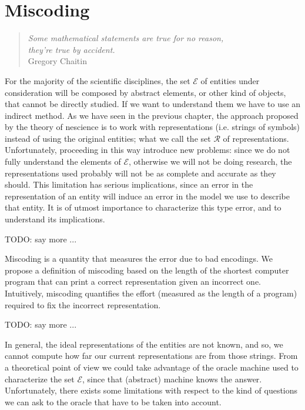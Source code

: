 %
%


\chapter{Miscoding}
\label{chap:Miscoding}

\begin{quote}
\begin{flushright}
\emph{Some mathematical statements are true for no reason,\\
they're true by accident.}\\
Gregory Chaitin
\end{flushright}
\end{quote}
\bigskip

For the majority of the scientific disciplines, the set $\mathcal{E}$ of entities under consideration will be composed by abstract elements, or other kind of objects, that cannot be directly studied. If we want to understand them we have to use an indirect method. As we have seen in the previous chapter, the approach proposed by the theory of nescience is to work with representations (i.e. strings of symbols) instead of using the original entities; what we call the set $\mathcal{R}$ of representations. Unfortunately, proceeding in this way introduce new problems: since we do not fully understand the elements of $\mathcal{E}$, otherwise we will not be doing research, the representations used probably will not be as complete and accurate as they should. This limitation has serious implications, since an error in the representation of an entity will induce an error in the model we use to describe that entity. It is of utmost importance to characterize this type error, and to understand its implications.

{\color{red} TODO: say more ...}

Miscoding is a quantity that measures the error due to bad encodings. We propose a definition of miscoding based on the length of the shortest computer program that can print a correct representation given an incorrect one. Intuitively, miscoding quantifies the effort (measured as the length of a program) required to fix the incorrect representation.

{\color{red} TODO: say more ...}

In general, the ideal representations of the entities are not known, and so, we cannot compute how far our current representations are from those strings. From a theoretical point of view we could take advantage of the oracle machine used to characterize the set $\mathcal{E}$, since that (abstract) machine knows the answer. Unfortunately, there exists some limitations with respect to the kind of questions we can ask to the oracle that have to be taken into account.

